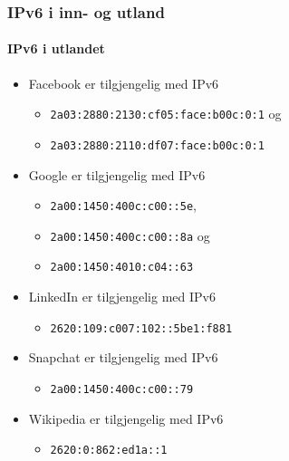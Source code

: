 \begin{frame}%
  \frametitle{IPv6 i inn- og utland}
  \framesubtitle{IPv6 i utlandet}
  \begin{itemize}%
  \item Facebook er tilgjengelig med IPv6
    \begin{itemize}%
    \item \texttt{2a03:2880:2130:cf05:\alert<2>{face}:\alert<2>{b00c}:0:1} og
    \item \texttt{2a03:2880:2110:df07:\alert<2>{face}:\alert<2>{b00c}:0:1}
    \end{itemize}
  \item Google er tilgjengelig med IPv6
    \begin{itemize}%
    \item \texttt{2a00:1450:400c:c00::5e},
    \item \texttt{2a00:1450:400c:c00::8a} og
    \item \texttt{2a00:1450:4010:c04::63}
    \end{itemize}
  \item LinkedIn er tilgjengelig med IPv6
    \begin{itemize}%
    \item \texttt{2620:109:c007:102::5be1:f881}
    \end{itemize}
  \item Snapchat er tilgjengelig med IPv6
    \begin{itemize}%
    \item \texttt{2a00:1450:400c:c00::79}
    \end{itemize}
  \item Wikipedia er tilgjengelig med IPv6
    \begin{itemize}%
    \item \texttt{2620:0:862:\alert<2>{ed1a}::1}
    \end{itemize}
  \end{itemize}
\end{frame}

